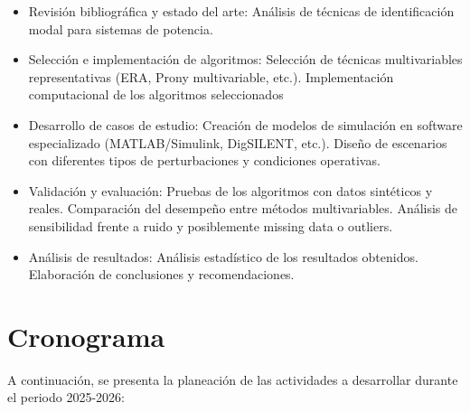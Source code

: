 \begin{itemize}

\item Revisión bibliográfica y estado del arte: Análisis de técnicas de identificación modal para 
sistemas de potencia.
\item Selección e implementación de algoritmos: Selección de técnicas multivariables representativas 
(ERA, Prony multivariable, etc.). Implementación computacional de los algoritmos seleccionados
\item Desarrollo de casos de estudio: Creación de modelos de simulación en software especializado 
(MATLAB/Simulink, DigSILENT, etc.). Diseño de escenarios con diferentes tipos de perturbaciones y 
condiciones operativas.
\item Validación y evaluación: Pruebas de los algoritmos con datos sintéticos y reales. Comparación del 
desempeño entre métodos multivariables. Análisis de sensibilidad frente a ruido y posiblemente missing 
data o outliers.
\item Análisis de resultados: Análisis estadístico de los resultados obtenidos. Elaboración de 
conclusiones y recomendaciones.

\end{itemize}

\section{Cronograma}

A continuación, se presenta la planeación de las actividades a desarrollar durante el periodo 
2025-2026:  



\chapterbibliography 









